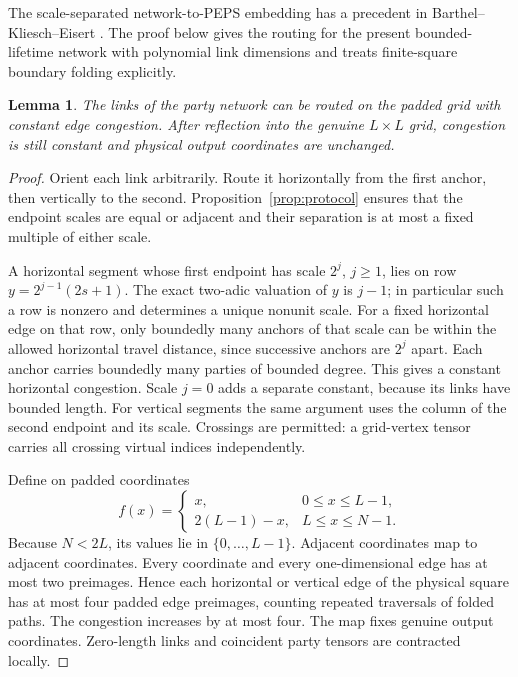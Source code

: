 \documentclass[11pt]{article}
\numberwithin{equation}{section}
\newtheorem{lemma}[theorem]{Lemma}
\theoremstyle{definition}
\theoremstyle{remark}
\begin{document}
The scale-separated network-to-PEPS embedding has a precedent in
Barthel--Kliesch--Eisert \cite[Section~III.C, Eqs.~(7)--(12)]{BarthelKlieschEisert2010}.
The proof below gives the routing for the present bounded-lifetime
network with polynomial link dimensions and treats finite-square
boundary folding explicitly.

\begin{lemma}\label{lem:routing}
The links of the party network can be routed on the padded grid with
constant edge congestion. After reflection into the genuine $L\times L$
grid, congestion is still constant and physical output coordinates are
unchanged.
\end{lemma}
\begin{proof}
Orient each link arbitrarily. Route it horizontally from the first
anchor, then vertically to the second. Proposition~\ref{prop:protocol}
ensures that the endpoint scales are equal or adjacent and their
separation is at most a fixed multiple of either scale.

A horizontal segment whose first endpoint has scale $2^j$, $j\ge1$,
lies on row
$y=2^{j-1}(2s+1)$. The exact two-adic valuation of $y$ is $j-1$; in
particular such a row is nonzero and determines a unique nonunit scale.
For a fixed horizontal edge on that row, only boundedly many anchors of
that scale can be within the allowed horizontal travel distance, since
successive anchors are $2^j$ apart. Each anchor carries boundedly many
parties of bounded degree. This gives a constant horizontal congestion.
Scale $j=0$ adds a separate constant, because its links have bounded
length. For vertical segments the same argument uses the column of the
second endpoint and its scale. Crossings are permitted: a grid-vertex
tensor carries all crossing virtual indices independently.

Define on padded coordinates
\[
 f(x)=\begin{cases}
 x,&0\le x\le L-1,\\
 2(L-1)-x,&L\le x\le N-1.
 \end{cases}
\]
Because $N<2L$, its values lie in $\{0,\ldots,L-1\}$.
Adjacent coordinates map to adjacent coordinates. Every coordinate and
every one-dimensional edge has at most two preimages. Hence each
horizontal or vertical edge of the physical square has at most four
padded edge preimages, counting repeated traversals of folded paths.
The congestion increases by at most four. The map fixes genuine output
coordinates. Zero-length links and coincident party tensors are contracted
locally.
\end{proof}
\end{document}
